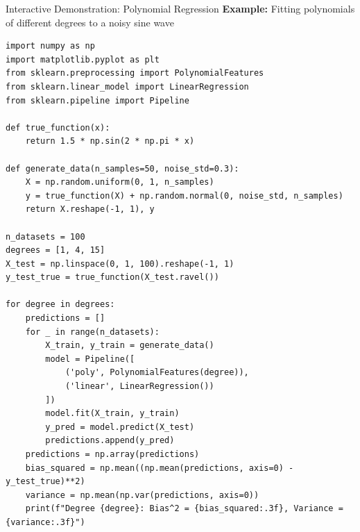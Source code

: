 \documentclass[aspectratio=169,11pt]{beamer}
\begin{document}
\begin{frame}[fragile]{Interactive Demonstration: Polynomial Regression}
\textbf{Example:} Fitting polynomials of different degrees to a noisy sine wave

\begin{lstlisting}[basicstyle=\ttfamily\tiny]
import numpy as np
import matplotlib.pyplot as plt
from sklearn.preprocessing import PolynomialFeatures
from sklearn.linear_model import LinearRegression
from sklearn.pipeline import Pipeline

def true_function(x):
    return 1.5 * np.sin(2 * np.pi * x)

def generate_data(n_samples=50, noise_std=0.3):
    X = np.random.uniform(0, 1, n_samples)
    y = true_function(X) + np.random.normal(0, noise_std, n_samples)
    return X.reshape(-1, 1), y

n_datasets = 100
degrees = [1, 4, 15]
X_test = np.linspace(0, 1, 100).reshape(-1, 1)
y_test_true = true_function(X_test.ravel())

for degree in degrees:
    predictions = []
    for _ in range(n_datasets):
        X_train, y_train = generate_data()
        model = Pipeline([
            ('poly', PolynomialFeatures(degree)),
            ('linear', LinearRegression())
        ])
        model.fit(X_train, y_train)
        y_pred = model.predict(X_test)
        predictions.append(y_pred)
    predictions = np.array(predictions)
    bias_squared = np.mean((np.mean(predictions, axis=0) - y_test_true)**2)
    variance = np.mean(np.var(predictions, axis=0))
    print(f"Degree {degree}: Bias^2 = {bias_squared:.3f}, Variance = {variance:.3f}")
\end{lstlisting}
\end{frame}
\end{document}
